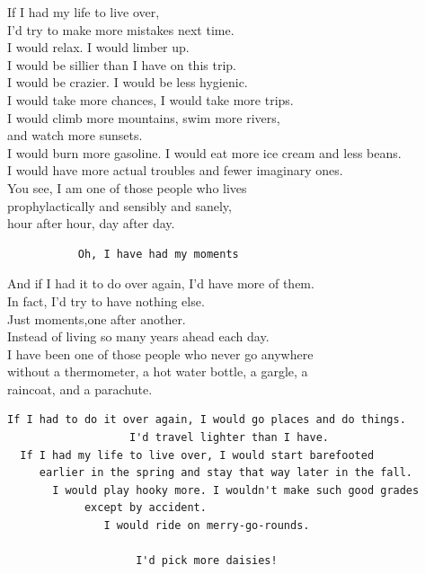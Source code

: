 \documentclass[
]{book}
\renewenvironment{quote}{\begin{VF}}{\end{VF}}
\begin{document}
\begin{quote}
If I had my life to live over,\\
I'd try to make more mistakes next time.\\
I would relax. I would limber up.\\
I would be sillier than I have on this trip.\\
I would be crazier. I would be less hygienic.\\
I would take more chances, I would take more trips.\\
I would climb more mountains, swim more rivers,\\
and watch more sunsets.\\
I would burn more gasoline. I would eat more ice cream and less beans.\\
I would have more actual troubles and fewer imaginary ones.\\
You see, I am one of those people who lives\\
prophylactically and sensibly and sanely,\\
hour after hour, day after day.

\begin{verbatim}
           Oh, I have had my moments  
\end{verbatim}

And if I had it to do over again, I'd have more of them.\\
In fact, I'd try to have nothing else.\\
Just moments,one after another.\\
Instead of living so many years ahead each day.\\
I have been one of those people who never go anywhere\\
without a thermometer, a hot water bottle, a gargle, a\\
raincoat, and a parachute.

\begin{verbatim}
If I had to do it over again, I would go places and do things.  
                   I'd travel lighter than I have.  
  If I had my life to live over, I would start barefooted  
     earlier in the spring and stay that way later in the fall.  
       I would play hooky more. I wouldn't make such good grades  
            except by accident.  
               I would ride on merry-go-rounds.  

                    I'd pick more daisies!  
\end{verbatim}
\end{quote}
\end{document}
